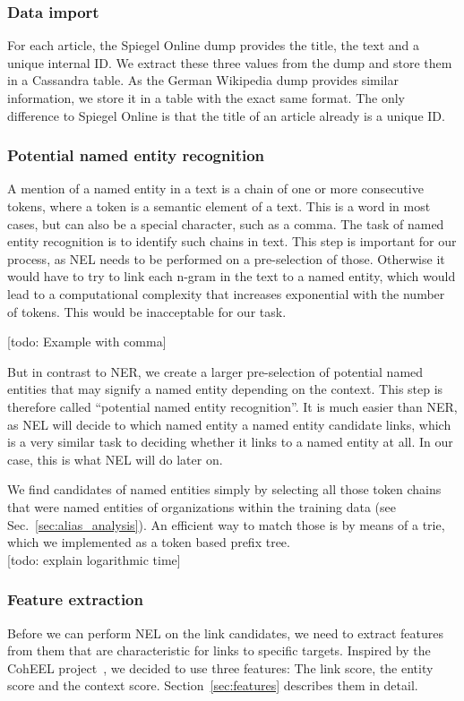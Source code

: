 \subsubsection{Data import}
For each article, the Spiegel Online dump provides the title, the text and a unique internal ID. We extract these three values from the dump and store them in a Cassandra table. As the German Wikipedia dump provides similar information, we store it in a table with the exact same format. The only difference to Spiegel Online is that the title of an article already is a unique ID.\\

\subsubsection{Potential named entity recognition}
A mention of a named entity in a text is a chain of one or more consecutive tokens, where a token is a semantic element of a text. This is a word in most cases, but can also be a special character, such as a comma. The task of named entity recognition is to identify such chains in text. This step is important for our process, as NEL needs to be performed on a pre-selection of those. Otherwise it would have to try to link each n-gram in the text to a named entity, which would lead to a computational complexity that increases exponential with the number of tokens. This would be inacceptable for our task.

[todo: Example with comma]

But in contrast to NER, we create a larger pre-selection of potential named entities that may signify a named entity depending on the context. This step is therefore called "`potential named entity recognition"'. It is much easier than NER, as NEL will decide to which named entity a named entity candidate links, which is a very similar task to deciding whether it links to a named entity at all. In our case, this is what NEL will do later on.

We find candidates of named entities simply by selecting all those token chains that were named entities of organizations within the training data (see Sec.~\ref{sec:alias_analysis}). An efficient way to match those is by means of a trie, which we implemented as a token based prefix tree.\\

[todo: explain logarithmic time]


\subsubsection{Feature extraction}
Before we can perform NEL on the link candidates, we need to extract features from them that are characteristic for links to specific targets. Inspired by the CohEEL project~\cite{coheel}, we decided to use three features: The link score, the entity score and the context score. Section~\ref{sec:features} describes them in detail.


